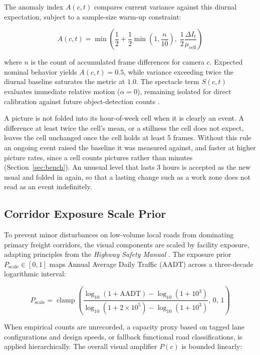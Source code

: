 \documentclass[10pt,journal,compsoc]{IEEEtran}
\begin{document}
The anomaly index $A(c,t)$ compares current variance against this diurnal expectation, subject to a sample-size warm-up constraint:

\begin{equation}
A(c,t) = \min\left( \frac{1}{2} + \frac{1}{2}\min\left(1, \frac{n}{10}\right),\; \frac{1}{2}\frac{\Delta I_t}{\mu_{\text{cell}}} \right)
\label{eq:anomaly}
\end{equation}

\noindent where $n$ is the count of accumulated frame differences for camera $c$. Expected nominal behavior yields $A(c,t) = 0.5$, while variance exceeding twice the diurnal baseline saturates the metric at $1.0$. The spectacle term $S(c,t)$ evaluates immediate relative motion ($\alpha = 0$), remaining isolated for direct calibration against future object-detection counts \cite{itti1998}.

A picture is not folded into its hour-of-week cell when it is clearly an event. A difference at least twice the cell's mean, or a stillness the cell does not expect, leaves the cell unchanged once the cell holds at least 5 frames. Without this rule an ongoing event raised the baseline it was measured against, and faster at higher picture rates, since a cell counts pictures rather than minutes (Section~\ref{sec:bench}). An unusual level that lasts 3 hours is accepted as the new usual and folded in again, so that a lasting change such as a work zone does not read as an event indefinitely.

\subsection{Corridor Exposure Scale Prior}
To prevent minor disturbances on low-volume local roads from dominating primary freight corridors, the visual components are scaled by facility exposure, adapting principles from the \textit{Highway Safety Manual} \cite{aashto2010}. The exposure prior $P_{\text{scale}} \in [0, 1]$ maps Annual Average Daily Traffic ($\text{AADT}$) across a three-decade logarithmic interval:

\begin{equation}
P_{\text{scale}} = \operatorname{clamp}\left( \frac{\log_{10}(1 + \text{AADT}) - \log_{10}(1 + 10^3)}{\log_{10}(1 + 2 \times 10^5) - \log_{10}(1 + 10^3)},\, 0,\, 1 \right)
\label{eq:scale}
\end{equation}

When empirical counts are unrecorded, a capacity proxy based on tagged lane configurations and design speeds, or fallback functional road classifications, is applied hierarchically. The overall visual amplifier $P(c)$ is bounded linearly:
\end{document}
